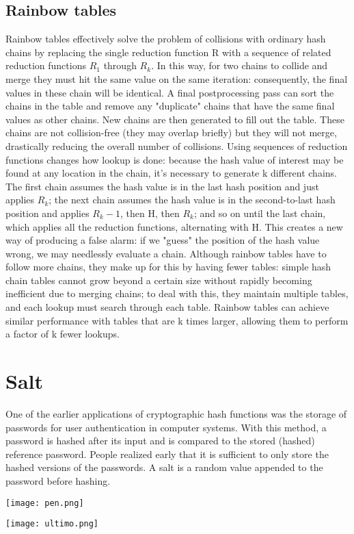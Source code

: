 \documentclass{article}
\begin{document}
\subsection{Rainbow tables}
Rainbow tables effectively solve the problem of collisions with ordinary hash chains by replacing the single reduction function R with a sequence of related reduction functions $R_1$ through $R_k$. In this way, for two chains to collide and merge they must hit the same value on the same iteration: consequently, the final values in these chain will be identical. A final postprocessing pass can sort the chains in the table and remove any "duplicate" chains that have the same final values as other chains. New chains are then generated to fill out the table. These chains are not collision-free (they may overlap briefly) but they will not merge, drastically reducing the overall number of collisions.
Using sequences of reduction functions changes how lookup is done: because the hash value of interest may be found at any location in the chain, it's necessary to generate k different chains. The first chain assumes the hash value is in the last hash position and just applies $R_k$; the next chain assumes the hash value is in the second-to-last hash position and applies $R_k−1$, then H, then $R_k$; and so on until the last chain, which applies all the reduction functions, alternating with H. This creates a new way of producing a false alarm: if we "guess" the position of the hash value wrong, we may needlessly evaluate a chain.
Although rainbow tables have to follow more chains, they make up for this by having fewer tables: simple hash chain tables cannot grow beyond a certain size without rapidly becoming inefficient due to merging chains; to deal with this, they maintain multiple tables, and each lookup must search through each table. Rainbow tables can achieve similar performance with tables that are k times larger, allowing them to perform a factor of k fewer lookups.
\section{Salt}
One of the earlier applications of cryptographic hash functions was the storage of passwords for user authentication in computer systems. With this method, a password is hashed after its input and is compared to the stored (hashed) reference password. People realized early that it is sufficient to only store the hashed versions of the passwords.
A salt is a random value appended to the password before hashing.
\begin{center}
\texttt{[image: pen.png]}
\end{center}
\begin{center}
\texttt{[image: ultimo.png]}
\end{center}
\end{document}
